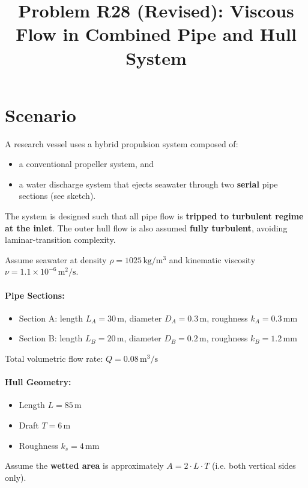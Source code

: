 \documentclass[12pt,a4paper]{article}
\title{Problem R28 (Revised): Viscous Flow in Combined Pipe and Hull System}
\author{}
\date{}
\begin{document}
\maketitle

\section*{Scenario}

A research vessel uses a hybrid propulsion system composed of:
\begin{itemize}
    \item a conventional propeller system, and
    \item a water discharge system that ejects seawater through two \textbf{serial} pipe sections (see sketch).
\end{itemize}

The system is designed such that all pipe flow is \textbf{tripped to turbulent regime at the inlet}. The outer hull flow is also assumed \textbf{fully turbulent}, avoiding laminar-transition complexity.

\medskip
Assume seawater at density $\rho = 1025\,\mathrm{kg/m^3}$ and kinematic viscosity $\nu = 1.1 \times 10^{-6}\,\mathrm{m^2/s}$.

\paragraph{Pipe Sections:}
\begin{itemize}
    \item Section A: length $L_A = 30\,\mathrm{m}$, diameter $D_A = 0.3\,\mathrm{m}$, roughness $k_A = 0.3\,\mathrm{mm}$
    \item Section B: length $L_B = 20\,\mathrm{m}$, diameter $D_B = 0.2\,\mathrm{m}$, roughness $k_B = 1.2\,\mathrm{mm}$
\end{itemize}
Total volumetric flow rate: $Q = 0.08\,\mathrm{m^3/s}$

\paragraph{Hull Geometry:}
\begin{itemize}
    \item Length $L = 85\,\mathrm{m}$
    \item Draft $T = 6\,\mathrm{m}$
    \item Roughness $k_s = 4\,\mathrm{mm}$
\end{itemize}
Assume the \textbf{wetted area} is approximately $A = 2 \cdot L \cdot T$ (i.e. both vertical sides only).
\end{document}
